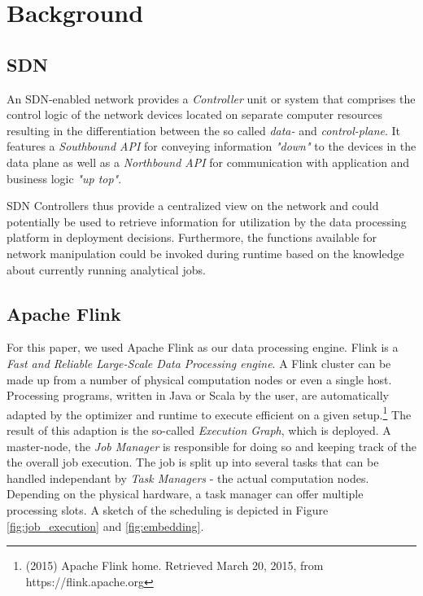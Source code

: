 \section{Background}
\subsection{SDN}
An SDN-enabled network provides a \textit{Controller} unit or system that comprises the control
logic of the network devices located on separate computer resources resulting in the differentiation
between the so called \textit{data-} and \textit{control-plane}. It features a \textit{Southbound
API} for conveying information \emph{"down"} to the devices in the data plane as well as a
\textit{Northbound API} for communication with application and business logic \emph{"up top"}.

SDN Controllers thus provide a centralized view on the network and could potentially be used to
retrieve information for utilization by the data processing platform in deployment decisions.
Furthermore, the functions available for network manipulation could be invoked during runtime based
on the knowledge about currently running analytical jobs.

\subsection{Apache Flink}
For this paper, we used Apache Flink as our data processing engine. Flink is a \textit{Fast and
Reliable Large-Scale Data Processing engine}. A Flink cluster can be made up from a number of
physical computation nodes or even a single host. Processing programs, written in Java or Scala by
the user, are automatically adapted by the optimizer and runtime to execute efficient on a given
setup.\footnote{(2015) Apache Flink home. Retrieved March 20, 2015, from https://flink.apache.org}
The result of this adaption is the so-called \textit{Execution Graph}, which is deployed. A
master-node, the \textit{Job Manager} is responsible for doing so and keeping track of the the
overall job execution. The job is split up into several tasks that can be handled independant by
\textit{Task Managers} - the actual computation nodes. Depending on the physical hardware, a task
manager can offer multiple processing slots. A sketch of the scheduling is depicted in Figure
\ref{fig:job_execution} and \ref{fig:embedding}.

